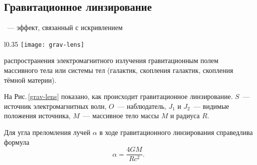 \subsection{Гравитационное линзирование}

~--- эффект, связанный с искривлением
\begin{wrapfigure}[9]{l}{0.35\tw}
	\centering
	\vspace{-.5pc}
	\texttt{[image: grav-lens]}
	\caption{Гравитационное линзирование}
	\label{grav-lens}
\end{wrapfigure} 
 распространения электромагнитного излучения гравитационным полем массивного тела или системы тел (галактик, скопления галактик, скопления тёмной материи).

На Рис.\,\ref{grav-lens} показано, как происходит гравитационное линзирование. $S$~--- источник электромагнитных волн, $O$~--- наблюдатель, $J_1$ и $J_2$~--- видимые положения источника, $M$~--- массивное тело массы $M$ и радиуса $R$.

Для угла преломления лучей $\alpha$ в ходе гравитационного линзирования справедлива формула
\begin{equation}
	\alpha = \frac{4 G M}{R c^2}.
\end{equation}